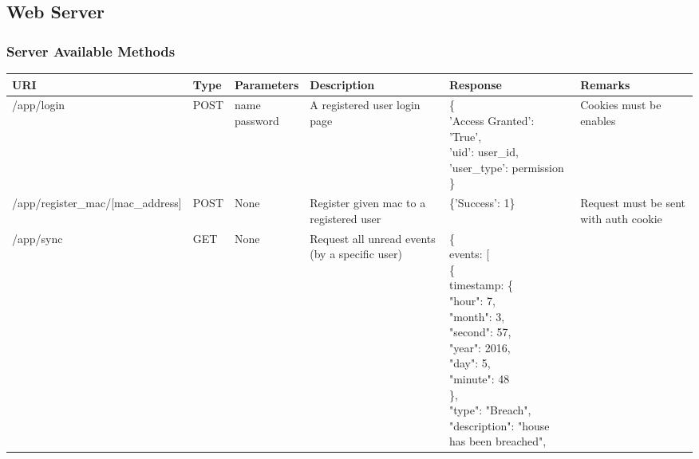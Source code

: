 \documentclass[10pt]{article}
\begin{document}
\subsection{Web Server}
\begin{landscape}
\subsubsection{Server Available Methods}
  \begin{adjustwidth}{-3cm}{} 
    \begin{tabular}{| l | l | l | p{3cm} | p{5.5cm} | l |}
      \hline
      \textbf{URI} & \textbf{Type} & \textbf{Parameters} & \textbf{Description} & \textbf{Response} & \textbf{Remarks} \\ \hline
      /app/login & POST & \pbox{30cm}{name \\ password} & A registered user login page & \pbox{25cm}{\{ \\
      'Access Granted': 'True',\\ 'uid': user\_id,\\ 'user\_type': permission \\ \}} & Cookies must be enables \\ \hline
     /app/register\_mac/[mac\_address] & POST & None & Register given mac to a registered user &\{'Success': 1\} & Request must be sent with auth cookie \\ \hline    
    /app/sync & GET & None & Request all unread events (by a specific user) & \pbox{25cm}{\{ \\ 
             	\quad events: [ \\ 
             		\qquad \{ \\ 
             			\qquad \quad timestamp: \{ \\ 
             				\qquad \quad \quad "hour": 7, \\ 
       					    \qquad \quad \quad "month": 3, \\ 
                            \qquad \quad \quad "second": 57, \\ 
             				\qquad \quad \quad "year": 2016, \\ 
             				\qquad \quad \quad "day": 5, \\ 
             				\qquad \quad \quad "minute": 48 \\ 
             			\qquad \quad \}, \\ 
             			\qquad \quad "type": "Breach", \\ 
             			\qquad \quad "description": "house has been breached", \\ 
}
\end{tabular}
\end{adjustwidth}
\end{landscape}
\end{document}
